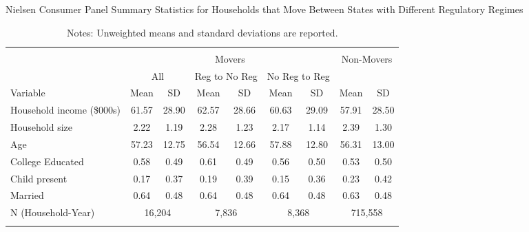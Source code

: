 \begin{table}[!htbp] \centering
\caption{Nielsen Consumer Panel Summary Statistics for Households that Move Between States with Different Regulatory Regimes}
\label{tab:summaryStatsUnitLawsMovers}
\begin{tabular}{lcccccccc}
\\[-1.8ex]\hline
\hline \\[-1.8ex]
& \multicolumn{6}{c}{Movers} & \multicolumn{2}{c}{Non-Movers}\\
                      & \multicolumn{2}{c}{All} & \multicolumn{2}{c}{Reg to No Reg} & \multicolumn{2}{c}{No Reg to Reg}  & \multicolumn{2}{c}{} \\
Variable                  & Mean  & SD    & Mean  & SD    & Mean  & SD     & Mean    & SD  \\
\hline
Household income (\$000s) & 61.57 & 28.90 & 62.57 & 28.66 & 60.63 & 29.09  & 57.91   & 28.50 \\
Household size            & 2.22  & 1.19  & 2.28  & 1.23  & 2.17  & 1.14   & 2.39    & 1.30 \\
Age                       & 57.23 & 12.75 & 56.54 & 12.66 & 57.88 & 12.80  & 56.31   & 13.00\\
College Educated          & 0.58  & 0.49  & 0.61  & 0.49  & 0.56  & 0.50   & 0.53    & 0.50 \\
Child present             & 0.17  & 0.37  & 0.19  & 0.39  & 0.15  & 0.36   & 0.23    & 0.42 \\
Married                   & 0.64  & 0.48  & 0.64  & 0.48  & 0.64  & 0.48   & 0.63    & 0.48 \\
N (Household-Year)        & \multicolumn{2}{c}{16,204} & \multicolumn{2}{c}{7,836} & \multicolumn{2}{c}{8,368} & \multicolumn{2}{c}{715,558}
\\[-1.8ex]\hline
\hline \\[-1.8ex]
\end{tabular}
\caption*{Notes: Unweighted means and standard deviations are reported.}
\end{table}
